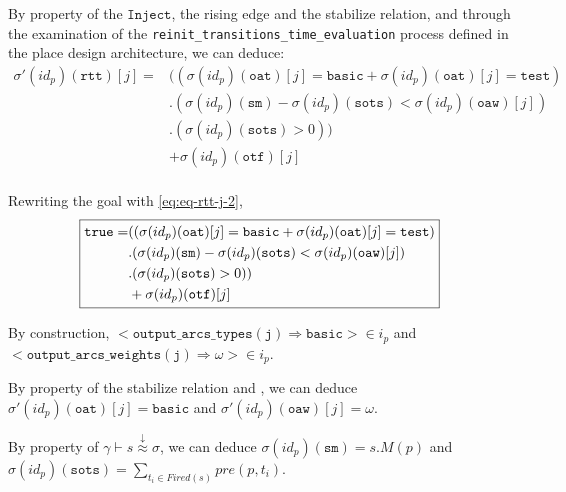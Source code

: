 \documentclass[dvipsnames,12pt]{article}
\begin{document}
\begin{niproof}
\begin{itemize}
\begin{itemize}
\begin{itemize}
        By property of the $\mathtt{Inject}$, the \hvhdl{}
        rising edge and the stabilize relation, and through the
        examination of the \texttt{reinit_transitions_time_evaluation}
        process defined in the place design architecture, we can
        deduce:
        \begin{equation}
          \label{eq:eq-rtt-j-2}
          \begin{split}
            \sigma'(id_p)(\texttt{rtt})[j]=& \big((\sigma(id_p)(\texttt{oat})[j]=\mathtt{basic}+\sigma(id_p)(\texttt{oat})[j]=\mathtt{test}) \\
            & .(\sigma(id_p)(\texttt{sm})-\sigma(id_p)(\texttt{sots})<\sigma(id_p)(\texttt{oaw})[j])\\
            & .(\sigma(id_p)(\texttt{sots})>0)\big)\\
            & +\sigma(id_p)(\texttt{otf})[j] \\
          \end{split}
        \end{equation}

        Rewriting the goal with \eqref{eq:eq-rtt-j-2},
        \begin{equation*}
          \fbox{$\begin{split}
              \mathtt{true}=& ((\sigma(id_p)(\texttt{oat})[j]=\mathtt{basic}+\sigma(id_p)(\texttt{oat})[j]=\mathtt{test}) \\
              & .(\sigma(id_p)(\texttt{sm})-\sigma(id_p)(\texttt{sots})<\sigma(id_p)(\texttt{oaw})[j])\\
              & .(\sigma(id_p)(\texttt{sots})>0))\\
              & +\sigma(id_p)(\texttt{otf})[j] \\
            \end{split}$}
        \end{equation*}

        By construction,
        ${<}\mathtt{output\_arcs\_types(j)\Rightarrow{}basic}{>}\in{}i_p$
        and\\
        ${<}\mathtt{output\_arcs\_weights(j)\Rightarrow{}}\omega{>}\in{}i_p$.
        
        By property of the stabilize relation and \InCsCompP, we can
        deduce $\sigma'(id_p)(\texttt{oat})[j]=\mathtt{basic}$ and
        $\sigma'(id_p)(\texttt{oaw})[j]=\omega$.

        By property of
        $\gamma\vdash{}s\stackrel{\downarrow}{\approx}\sigma$, we can
        deduce $\sigma(id_p)(\texttt{sm})=s.M(p)$ and
        $\sigma(id_p)(\texttt{sots})=\sum\limits_{t_i\in{}Fired(s)}pre(p,t_i)$.


\end{itemize}
\end{itemize}
\end{itemize}
\end{niproof}
\end{document}
